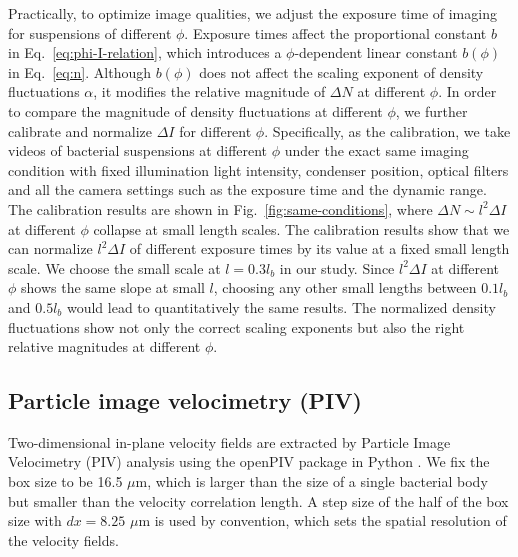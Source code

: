 \documentclass[9pt,twoside,lineno]{pnas-new}
\begin{document}
Practically, to optimize image qualities, we adjust the exposure time of imaging for suspensions of different $\phi$. Exposure times affect the proportional constant $b$ in Eq.~\ref{eq:phi-I-relation}, which introduces a $\phi$-dependent linear constant $b(\phi)$ in Eq.~\ref{eq:n}. Although $b(\phi)$ does not affect the scaling exponent of density fluctuations $\alpha$, it modifies the relative magnitude of $\Delta N$ at different $\phi$. In order to compare the magnitude of density fluctuations at different $\phi$,  we further calibrate and normalize $\Delta I$ for different $\phi$. Specifically, as the calibration, we take videos of bacterial suspensions at different $\phi$ under the exact same imaging condition with fixed illumination light intensity, condenser position, optical filters and all the camera settings such as the exposure time and the dynamic range. The calibration results are shown in Fig.~\ref{fig:same-conditions}, where $\Delta N \sim l^2 \Delta I$ at different $\phi$ collapse at small length scales. The calibration results show that we can normalize $l^2 \Delta I$ of different exposure times by its value at a fixed small length scale. We choose the small scale at $l = 0.3l_b$ in our study. Since $l^2 \Delta I$ at different $\phi$ shows the same slope at small $l$, choosing any other small lengths between $0.1l_b$ and $0.5l_b$ would lead to quantitatively the same results. The normalized density fluctuations show not only the correct scaling exponents but also the right relative magnitudes at different $\phi$.


\subsection{Particle image velocimetry (PIV)} \label{appendix-IA-PIV}

Two-dimensional in-plane velocity fields are extracted by Particle Image Velocimetry (PIV) analysis using the openPIV package in Python \cite{Liberzon2020}. We fix the box size to be 16.5 $\mu$m, which is larger than the size of a single bacterial body but smaller than the velocity correlation length. A step size of the half of the box size with $dx = 8.25$ $\mu$m is used by convention, which sets the spatial resolution of the velocity fields.
\end{document}
